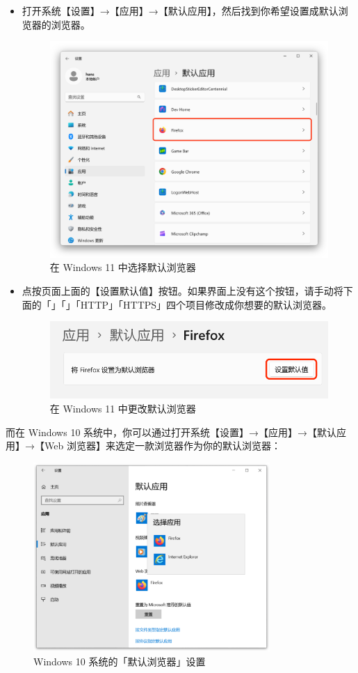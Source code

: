 \begin{itemize}
  \item 打开系统【设置】→【应用】→【默认应用】，然后找到你希望设置成默认浏览器的浏览器。
    \begin{figure}[htb!]
      \centering
      \includegraphics[width=.7\textwidth]{assets/software/Windows_11_default_browser.png}
      \caption{在 Windows 11 中选择默认浏览器}
      \label{fig:Windows_11_default_browser}
    \end{figure}
  \item 点按页面上面的【设置默认值】按钮。如果界面上没有这个按钮，请手动将下面的「」「」\linebreak「HTTP」「HTTPS」四个项目修改成你想要的默认浏览器。
    \begin{figure}[htb!]
      \centering
      \includegraphics[width=.6\textwidth]{assets/software/Setting_default_browser_Windows_11.png}
      \caption{在 Windows 11 中更改默认浏览器}
      \label{fig:Setting_default_browser_Windows_11}
    \end{figure}
\end{itemize}

而在 Windows 10 系统中，你可以通过打开系统【设置】→【应用】→【默认应用】→【Web 浏览器】来选定一款浏览器作为你的默认浏览器：

\begin{figure}[htb!]
  \centering
  \includegraphics[width=9cm]{assets/software/Setting_default_browser.png}
  \caption{Windows 10 系统的「默认浏览器」设置}
  \label{fig:Setting_default_browser}
\end{figure}

